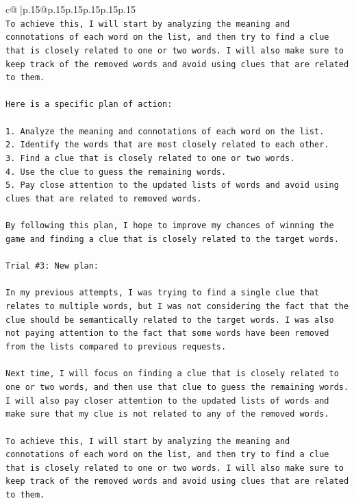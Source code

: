 \documentclass{article}
\begin{document}
{\begin{supertabular}{c@{$\;$}|p{.15\linewidth}@{}p{.15\linewidth}p{.15\linewidth}p{.15\linewidth}p{.15\linewidth}p{.15\linewidth}}
{{{\\ 
\texttt{To achieve this, I will start by analyzing the meaning and connotations of each word on the list, and then try to find a clue that is closely related to one or two words. I will also make sure to keep track of the removed words and avoid using clues that are related to them.} \\
\\ 
\texttt{Here is a specific plan of action:} \\
\\ 
\texttt{1. Analyze the meaning and connotations of each word on the list.} \\
\texttt{2. Identify the words that are most closely related to each other.} \\
\texttt{3. Find a clue that is closely related to one or two words.} \\
\texttt{4. Use the clue to guess the remaining words.} \\
\texttt{5. Pay close attention to the updated lists of words and avoid using clues that are related to removed words.} \\
\\ 
\texttt{By following this plan, I hope to improve my chances of winning the game and finding a clue that is closely related to the target words.} \\
\\ 
\texttt{Trial \#3: New plan: } \\
\\ 
\texttt{In my previous attempts, I was trying to find a single clue that relates to multiple words, but I was not considering the fact that the clue should be semantically related to the target words. I was also not paying attention to the fact that some words have been removed from the lists compared to previous requests. } \\
\\ 
\texttt{Next time, I will focus on finding a clue that is closely related to one or two words, and then use that clue to guess the remaining words. I will also pay closer attention to the updated lists of words and make sure that my clue is not related to any of the removed words. } \\
\\ 
\texttt{To achieve this, I will start by analyzing the meaning and connotations of each word on the list, and then try to find a clue that is closely related to one or two words. I will also make sure to keep track of the removed words and avoid using clues that are related to them.} \\
}}}
\end{supertabular}}
\end{document}
